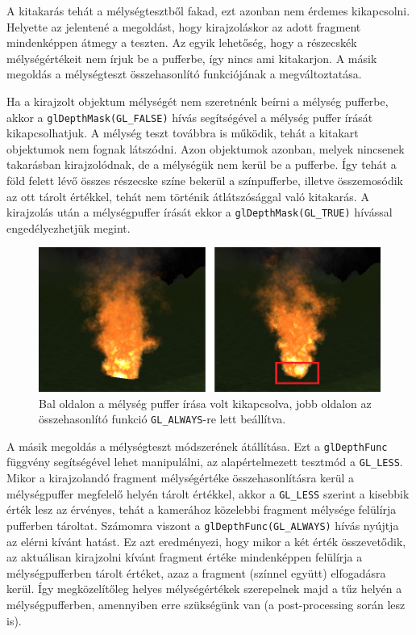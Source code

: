 A kitakarás tehát a mélységtesztből fakad, ezt azonban nem érdemes kikapcsolni. Helyette az jelentené a megoldást, hogy kirajzoláskor az adott fragment mindenképpen átmegy a teszten. Az egyik lehetőség, hogy a részecskék mélységértékeit nem írjuk be a pufferbe, így nincs ami kitakarjon. A másik megoldás a mélységteszt összehasonlító funkciójának a megváltoztatása.

Ha a kirajzolt objektum mélységét nem szeretnénk beírni a mélység pufferbe, akkor a \texttt{glDepthMask(GL\_FALSE)} hívás segítségével a mélység puffer írását kikapcsolhatjuk. A mélység teszt továbbra is működik, tehát a kitakart objektumok nem fognak látszódni. Azon objektumok azonban, melyek nincsenek takarásban kirajzolódnak, de a mélységük nem kerül be a pufferbe. Így tehát a föld felett lévő összes részecske színe bekerül a színpufferbe, illetve összemosódik az ott tárolt értékkel, tehát nem történik átlátszósággal való kitakarás. A kirajzolás után a mélységpuffer írását ekkor a \texttt{glDepthMask(GL\_TRUE)} hívással engedélyezhetjük megint.

\begin{figure}[h]
 \centering
 \includegraphics[width=\textwidth]{kepek/particleDepthComparison.png}
 \caption{Bal oldalon a mélység puffer írása volt kikapcsolva, jobb oldalon az összehasonlító funkció \texttt{GL\_ALWAYS}-re lett beállítva.}
 \label{fig:particleDepthComparison}
\end{figure}

A másik megoldás a mélységteszt módszerének átállítása. Ezt a \texttt{glDepthFunc} függvény segítségével lehet manipulálni, az alapértelmezett tesztmód a \texttt{GL\_LESS}. Mikor a kirajzolandó fragment mélységértéke összehasonlításra kerül a mélységpuffer megfelelő helyén tárolt értékkel, akkor a \texttt{GL\_LESS} szerint a kisebbik érték lesz az érvényes, tehát a kamerához közelebbi fragment mélysége felülírja pufferben tároltat. Számomra viszont a \texttt{glDepthFunc(GL\_ALWAYS)} hívás nyújtja az elérni kívánt hatást. Ez azt eredményezi, hogy mikor a két érték összevetődik, az aktuálisan kirajzolni kívánt fragment értéke mindenképpen felülírja a mélységpufferben tárolt értéket, azaz a fragment (színnel együtt) elfogadásra kerül. Így megközelítőleg helyes mélységértékek szerepelnek majd a tűz helyén a mélységpufferben, amennyiben erre szükségünk van (a post-processing során lesz is). 

